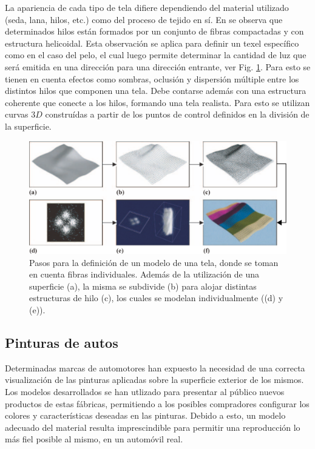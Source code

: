 La apariencia de cada tipo de tela difiere dependiendo del material utilizado (seda, lana, hilos, etc.) como del proceso de tejido en sí.
En \cite{Xu2001} se observa que determinados hilos están formados por un conjunto de fibras compactadas y con estructura helicoidal.
Esta observación se aplica para definir un texel específico como en el caso del pelo, el cual luego permite determinar la cantidad de luz que será emitida en una dirección para una dirección entrante, ver Fig. \ref{fg:tela}.
Para esto se tienen en cuenta efectos como sombras, oclusión y dispersión múltiple entre los distintos hilos que componen una tela.
Debe contarse además con una estructura coherente que conecte a los hilos, formando una tela realista.
Para esto se utilizan curvas $3D$ construídas a partir de los puntos de control definidos en la división de la superficie.


\begin{figure}
\center
\includegraphics[width=13cm]{figures/tela}
\caption[Pasos para la definición de un modelo de una tela]{Pasos para la definición de un modelo de una tela, donde se toman en cuenta fibras individuales. Además de la utilización de una superficie (a), la misma se subdivide (b) para alojar distintas estructuras de hilo (c), los cuales se modelan individualmente ((d) y (e)).}
\label{fg:tela}
\end{figure}

\subsection{Pinturas de autos}
Determinadas marcas de automotores han expuesto la necesidad de una correcta visualización de las pinturas aplicadas sobre la superficie exterior de los mismos.
Los modelos desarrollados se han utlizado para presentar al público nuevos productos de estas fábricas, permitiendo a los posibles compradores configurar los colores y características deseadas en las pinturas.
Debido a esto, un modelo adecuado del material resulta imprescindible para permitir una reproducción lo más fiel posible al mismo, en un automóvil real.

